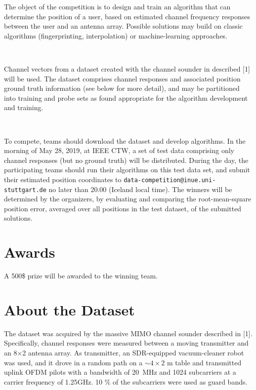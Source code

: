 \documentclass[letter]{moderncv} %
\begin{document}
The object of the competition is to design and train an algorithm that can determine the position of a user, based
on estimated channel frequency responses between the user  and  an antenna array. 
Possible solutions may build on classic algorithms (fingerprinting, interpolation) or  machine-learning   approaches. 

~

Channel vectors from  a dataset created with the channel sounder in described [1] will be used.  
The dataset comprises channel responses and associated position ground truth information (see below for more detail), and may be partitioned into training and probe sets as found appropriate for
the algorithm development and training.

~

To compete, teams should download the dataset and develop algorithms. 
In the morning of May 28, 2019, at IEEE CTW, a set of test data comprising only channel responses (but no ground truth) will be distributed. 
During the day, the participating teams should run their algorithms on this test data set, and submit their
estimated position coordinates to  
\texttt{data-competition@inue.uni-stuttgart.de} no later than 20.00 (Iceland local time).
The winners will be determined by the organizers, by evaluating and comparing the root-mean-square position error, averaged over all positions in the test
dataset, of the submitted solutions.


\section{Awards}

A 500\$ prize will be awarded to the winning team.

\section{About the Dataset}

The dataset was acquired by the massive MIMO channel sounder described in [1].
Specifically, channel responses were measured between a moving transmitter and an 8$\times$2 antenna array. 
As transmitter, an SDR-equipped vacuum-cleaner robot was used, and it drove in a random path on a $\sim 4\times 2$ m table and transmitted uplink OFDM pilots with a bandwidth of 20~MHz and 1024 subcarriers at a carrier frequency of 1.25GHz. 10 \% of the subcarriers were used as guard bands.
\vspace{22ex}
\end{document}
